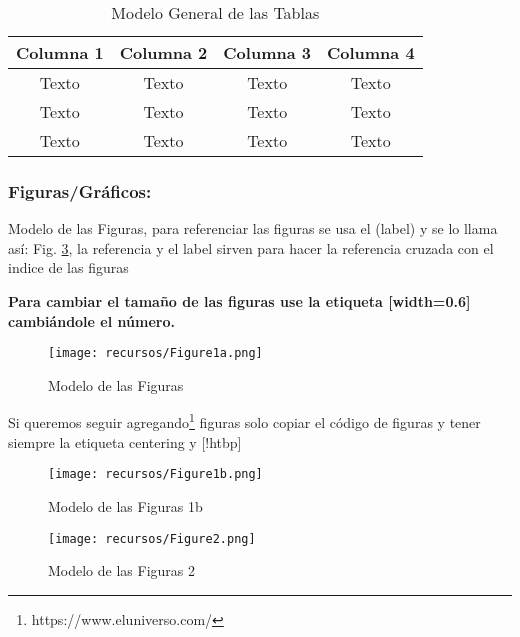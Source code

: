 \begin{table}[!htbp]
\centering
\large
\caption{{\fontsize{11pt}{13}\selectfont Modelo General de las Tablas \cite{upm56279}}}
\label{tbl:modelo}
\begin{tabular}{@{}cccc@{}}
\toprule
\textbf{Columna 1} & \textbf{Columna 2} & \textbf{Columna 3} & \textbf{Columna 4} \\ \midrule
Texto              & Texto              & Texto              & Texto              \\
Texto              & Texto              & Texto              & Texto              \\
Texto              & Texto              & Texto              & Texto              \\ \bottomrule
\end{tabular}
\end{table}


\subsubsection{Figuras/Gráficos:}
Modelo de las Figuras, para referenciar las figuras se usa el (label) y se lo llama así: Fig. \ref{fig:figura1a}, la referencia y el label sirven para hacer la referencia cruzada con el indice de las figuras

\textbf{Para cambiar el tamaño de las figuras use la etiqueta [width=0.6] cambiándole el n\'umero.}

\begin{figure}[!htbp]
    \centering
    \texttt{[image: recursos/Figure1a.png]}
    \caption{Modelo de las Figuras}
    \label{fig:figura1a}
\end{figure}

Si queremos seguir agregando\footnote{https://www.eluniverso.com/} figuras solo copiar el código de figuras y tener siempre la etiqueta centering y [!htbp]

\begin{figure}[!htbp]
    \centering
    \texttt{[image: recursos/Figure1b.png]}
    \caption{Modelo de las Figuras 1b \cite{upm56279}}
    \label{fig:figura1a}
\end{figure}

\begin{figure}[!htbp]
    \centering
    \texttt{[image: recursos/Figure2.png]}
    \caption{Modelo de las Figuras 2 \cite{upm56279}}
    \label{fig:figura1a}
\end{figure}



